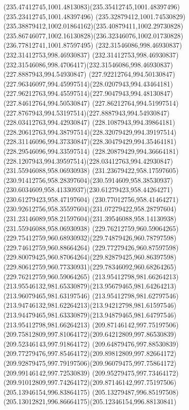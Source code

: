 {{  \curveto(235.47412745,1001.4813083)(235.35412745,1001.48397496)(235.23412745,1001.48397496)
  \curveto(235.32879412,1001.74530829)(235.38879412,1002.01864162)(235.40879411,1002.29730828)
  \curveto(235.86746077,1002.16130828)(236.32346076,1002.01730828)(236.77812741,1001.87597495)
  \moveto(232.31546086,998.46930837)
  \lineto(232.31412753,998.46930837)
  \curveto(232.31412753,998.46930837)(232.31546086,998.4706417)(232.31546086,998.46930837)
  \closepath
  \moveto(227.8887943,994.54930847)
  \curveto(227.92212764,994.50130847)(227.96346097,994.45997514)(228.0207943,994.43464181)
  \curveto(227.96212763,994.45597514)(227.9047943,994.48130847)(227.84612764,994.50530847)
  \curveto(227.86212764,994.51997514)(227.8767943,994.53197514)(227.8887943,994.54930847)
  \moveto(228.03412763,994.42930847)
  \curveto(228.1087943,994.39864181)(228.20612763,994.38797514)(228.32079429,994.39197514)
  \curveto(228.31146096,994.37330847)(228.30479429,994.35464181)(228.29546096,994.33597514)
  \curveto(228.20879429,994.36664181)(228.1207943,994.39597514)(228.03412763,994.42930847)
  \moveto(231.55946088,958.06930938)
  \curveto(231.23679422,958.17597605)(230.91412756,958.28397604)(230.5914609,958.38530937)
  \curveto(230.6034609,958.41330937)(230.61279423,958.44264271)(230.61279423,958.47197604)
  \curveto(230.77012756,958.41464271)(230.92612756,958.35597604)(231.07279422,958.28797604)
  \curveto(231.23146089,958.21597604)(231.39546088,958.14130938)(231.55946088,958.06930938)
  \moveto(229.76212759,960.59064265)
  \curveto(229.75412759,960.68930932)(229.74879426,960.78797598)(229.74612759,960.88664264)
  \curveto(229.77279426,960.87597598)(229.80079425,960.87064264)(229.82879425,960.86397598)
  \curveto(229.80612759,960.77330931)(229.78346092,960.68264265)(229.76212759,960.59064265)
  \moveto(213.95412798,981.66264213)
  \curveto(213.95546132,981.65330879)(213.95679465,981.64264213)(213.96079465,981.63197546)
  \curveto(213.95412798,981.62797546)(213.94746132,981.62264213)(213.94212798,981.61597546)
  \curveto(213.94479465,981.63330879)(213.94879465,981.64797546)(213.95412798,981.66264213)
  \moveto(209.87146142,997.75197506)
  \curveto(209.75812809,997.81064172)(209.64212809,997.86530839)(209.52346143,997.91864172)
  \curveto(209.64879476,997.88530839)(209.77279476,997.85464172)(209.89812809,997.82664172)
  \curveto(209.92879475,997.79197506)(209.96079475,997.75864172)(209.99146142,997.72530839)
  \curveto(209.95279475,997.73464172)(209.91012809,997.74264172)(209.87146142,997.75197506)
  \moveto(205.13946154,996.83864175)
  \curveto(205.13279487,996.85197508)(205.13012821,996.86664175)(205.12346154,996.88130841)
}}
